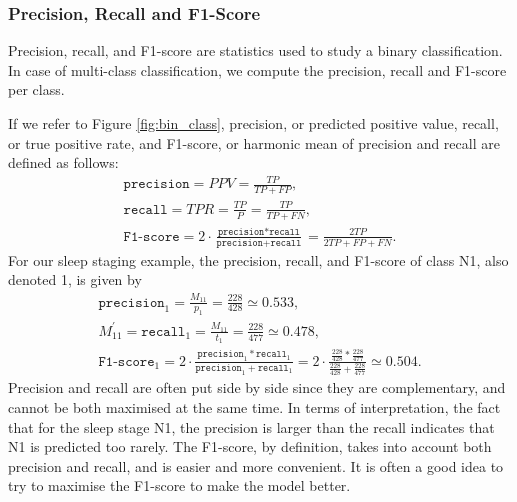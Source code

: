 \documentclass[titlepage, 11pt, a4paper, fancysections]{article}
\begin{document}
\subsubsection{Precision, Recall and F1-Score}
Precision, recall, and F1-score are statistics used to study a binary classification. In case of multi-class classification, we compute the precision, recall and F1-score per class. 

If we refer to Figure \ref{fig:bin_class}, precision, or predicted positive value, recall, or true positive rate, and F1-score, or harmonic mean of precision and recall are defined as follows:
\begin{align*}
    \texttt{precision} = PPV = \frac{TP}{TP + FP}, \\
    \texttt{recall} = TPR = \frac{TP}{P} = \frac{TP}{TP+FN}, \\
    \texttt{F1-score} = 2 \cdot \frac{\texttt{precision}*\texttt{recall}}{\texttt{precision}+\texttt{recall}} = \frac{2TP}{2TP + FP + FN}.
\end{align*}
For our sleep staging example, the precision, recall, and F1-score of class N1, also denoted 1, is given by 
\begin{align*}
    \texttt{precision}_1 = \frac{M_{11}}{p_1}=\frac{228}{428} \simeq 0.533, \\
    M^\prime_{11} = \texttt{recall}_{1} = \frac{M_{11}}{t_1}=\frac{228}{477} \simeq 0.478, \\
    \texttt{F1-score}_1 = 2 \cdot \frac{\texttt{precision}_1*\texttt{recall}_1}{\texttt{precision}_1+\texttt{recall}_1} = 2 \cdot \frac{\frac{228}{428}*\frac{228}{477}}{\frac{228}{428}+\frac{228}{477}} \simeq 0.504.
\end{align*}
Precision and recall are often put side by side since they are complementary, and cannot be both maximised at the same time. In terms of interpretation, the fact that for the sleep stage N1, the precision is larger than the recall indicates that N1 is predicted too rarely. The F1-score, by definition, takes into account both precision and recall, and is easier and more convenient. It is often a good idea to try to maximise the F1-score to make the model better. 
\end{document}

